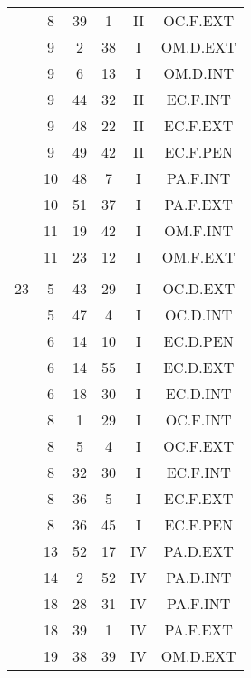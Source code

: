 \documentclass[12pt, a4paper]{article}
\begin{document}
\begin{multicols}{3}
{\begin{tabular}{c c c c c c}
	 	 	 	 & 8 & 39 & 1 & II & OC.F.EXT\\%
	 	 	 	 & 9 & 2 & 38 & I & OM.D.EXT\\%
	 	 	 	 & 9 & 6 & 13 & I & OM.D.INT\\%
	 	 	 	 & 9 & 44 & 32 & II & EC.F.INT\\%
	 	 	 	 & 9 & 48 & 22 & II & EC.F.EXT\\%
	 	 	 	 & 9 & 49 & 42 & II & EC.F.PEN\\%
	 	 	 	 & 10 & 48 & 7 & I & PA.F.INT\\%
	 	 	 	 & 10 & 51 & 37 & I & PA.F.EXT\\%
	 	 	 	 & 11 & 19 & 42 & I & OM.F.INT\\%
	 	 	 	 & 11 & 23 & 12 & I & OM.F.EXT\\%
	 	 	 	 & & & & & \\%
	 	 	 	23 & 5 & 43 & 29 & I & OC.D.EXT\\%
	 	 	 	 & 5 & 47 & 4 & I & OC.D.INT\\%
	 	 	 	 & 6 & 14 & 10 & I & EC.D.PEN\\%
	 	 	 	 & 6 & 14 & 55 & I & EC.D.EXT\\%
	 	 	 	 & 6 & 18 & 30 & I & EC.D.INT\\%
	 	 	 	 & 8 & 1 & 29 & I & OC.F.INT\\%
	 	 	 	 & 8 & 5 & 4 & I & OC.F.EXT\\%
	 	 	 	 & 8 & 32 & 30 & I & EC.F.INT\\%
	 	 	 	 & 8 & 36 & 5 & I & EC.F.EXT\\%
	 	 	 	 & 8 & 36 & 45 & I & EC.F.PEN\\%
	 	 	 	 & 13 & 52 & 17 & IV & PA.D.EXT\\%
	 	 	 	 & 14 & 2 & 52 & IV & PA.D.INT\\%
	 	 	 	 & 18 & 28 & 31 & IV & PA.F.INT\\%
	 	 	 	 & 18 & 39 & 1 & IV & PA.F.EXT\\%
	 	 	 	 & 19 & 38 & 39 & IV & OM.D.EXT\\%
	 	 \end{tabular}
 	}
\end{multicols}
\end{document}
